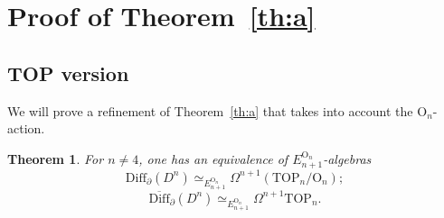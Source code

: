 \documentclass[11pt]{amsart}
\newtheorem{theorem}{Theorem}[section]
\theoremstyle{definition}
\newcommand{\Diffn}{\mathrm{Diff}_\partial(D^n)}
\newcommand{\Dbarn}{\overline{\mathrm{Diff}}_\partial(D^n)}
\newcommand{\TOP}{\mathrm{TOP}}
\newcommand{\OO}{\mathrm{O}}
\numberwithin{equation}{section}
\begin{document}
\section{Proof of Theorem~\ref{th:a}}\label{s:proof_a}
\subsection{TOP version}\label{ss:a_top}
We will prove a refinement of Theorem~\ref{th:a} that takes into account the $\OO_n$-action. 


\begin{theorem}\label{th:a_top}
For $n\neq 4$, one has an equivalence of $E_{n+1}^{\OO_n}$-algebras
\begin{equation}\label{eq:a_top_1}
\Diffn\simeq_{E_{n+1}^{\OO_n}}\Omega^{n+1}\left(\TOP_n/\OO_n\right);
\end{equation}
\begin{equation}\label{eq:a_top_2}
\Dbarn\simeq_{E_{n+1}^{\OO_n}}\Omega^{n+1}\TOP_n.
\end{equation}
\end{theorem}
\end{document}
